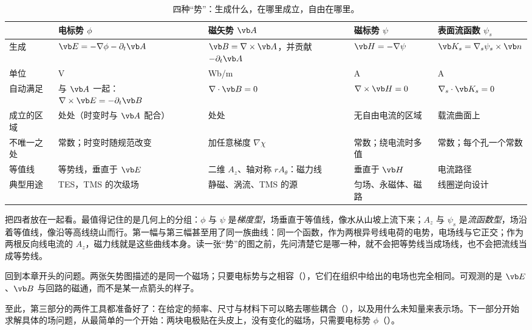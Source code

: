 \begin{table}[htbp]\centering\small
\caption{四种“势”：生成什么，在哪里成立，自由在哪里。}\label{tab:potentials-four}
\begin{tabularx}{\linewidth}{@{}l YYYY@{}}
\toprule
 & 电标势 $\phi$ & 磁矢势 $\vb A$ & 磁标势 $\psi$ & 表面流函数 $\psi_s$\\\midrule
生成 & $\vb E=-\nabla\phi-\partial_t\vb A$ & $\vb B=\nabla\times\vb A$，并贡献 $-\partial_t\vb A$ & $\vb H=-\nabla\psi$ & $\vb K_s=\nabla_s\psi_s\times\vb n$\\
单位 & V & Wb/m & A & A\\
自动满足 & 与 $\vb A$ 一起：$\nabla\times\vb E=-\partial_t\vb B$ & $\nabla\cdot\vb B=0$ & $\nabla\times\vb H=0$ & $\nabla_s\cdot\vb K_s=0$\\
成立的区域 & 处处（时变时与 $\vb A$ 配合） & 处处 & 无自由电流的区域 & 载流曲面上\\
不唯一之处 & 常数；时变时随规范改变 & 加任意梯度 $\nabla\chi$ & 常数；绕电流时多值 & 常数；每个孔一个常数\\
等值线 & 等势线，垂直于 $\vb E$ & 二维 $A_z$、轴对称 $rA_\theta$：磁力线 & 垂直于 $\vb H$ & 电流路径\\
典型用途 & TES，TMS 的次级场 & 静磁、涡流、TMS 的源 & 匀场、永磁体、磁路 & 线圈逆向设计\\
\bottomrule
\end{tabularx}
\end{table}



 把四者放在一起看。最值得记住的是几何上的分组：$\phi$ 与 $\psi$ 是\emph{梯度型}，场垂直于等值线，像水从山坡上流下来；$A_z$ 与 $\psi_s$ 是\emph{流函数型}，场沿着等值线，像沿等高线绕山而行。第一幅与第三幅甚至用了同一族曲线：同一个函数，作为两根异号线电荷的电势，电场线与它正交；作为两根反向线电流的 $A_z$，磁力线就是这些曲线本身。读一张“势”的图之前，先问清楚它是哪一种，就不会把等势线当成场线，也不会把流线当成等势线。


回到本章开头的问题。两张矢势图描述的是同一个磁场；只要电标势与之相容（），它们在组织中给出的电场也完全相同。可观测的是 $\vb E$、$\vb B$ 与回路的磁通，而不是某一点箭头的样子。

至此，第三部分的两件工具都准备好了：在给定的频率、尺寸与材料下可以略去哪些耦合（），以及用什么未知量来表示场。下一部分开始求解具体的场问题，从最简单的一个开始：两块电极贴在头皮上，没有变化的磁场，只需要电标势 $\phi$（）。

